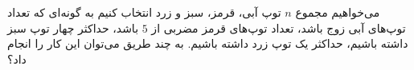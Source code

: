     \p 
می‌خواهیم مجموع
$n$
توپ آبی، قرمز، سبز و زرد انتخاب کنیم به گونه‌ای که تعداد توپ‌های آبی زوج باشد، تعداد توپ‌های قرمز مضربی از
$5$
باشد، حداکثر چهار توپ سبز داشته باشیم، حداکثر یک توپ زرد داشته باشیم. به چند طریق می‌توان این کار را انجام داد؟
